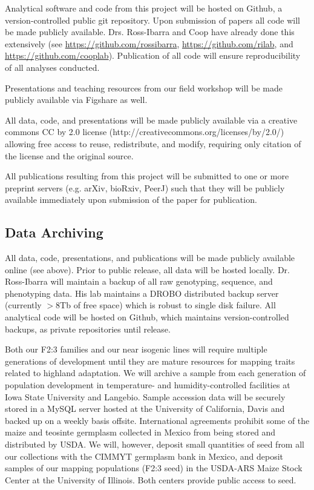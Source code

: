 Analytical software and code from this project will be hosted on Github, a version-controlled public git repository.  Upon submission of papers all code will be made publicly available.  Drs. Ross-Ibarra and Coop have already done this extensively (see \url{https://github.com/rossibarra}, \url{https://github.com/rilab}, and \url{https://github.com/cooplab}). Publication of all code will ensure reproducibility of all analyses conducted.  

Presentations and teaching resources from our field workshop will be made publicly available via Figshare as well.

All data, code, and presentations will be made publicly available via a creative commons CC by 2.0 license (http://creativecommons.org/licenses/by/2.0/) allowing free access to reuse, redistribute, and modify, requiring only citation of the license and the original source.

All publications resulting from this project will be submitted to one or more preprint servers (e.g. arXiv, bioRxiv, PeerJ) such that they will be publicly available immediately upon submission of the paper for publication.

\subsection*{Data Archiving}

All data, code, presentations, and publications will be made publicly available online (see above).  Prior to public release, all data will be hosted locally.  Dr. Ross-Ibarra will maintain a backup of all raw genotyping, sequence, and phenotyping data.  His lab maintains a DROBO distributed backup server (currently $>8$Tb of free space) which is robust to single disk failure. All analytical code will be hosted on Github, which maintains version-controlled backups, as private repositories until release. 

Both our F2:3 families and our near isogenic lines will require multiple generations of development until they are mature resources for mapping traits related to highland adaptation. We will archive a sample from each generation of population development in temperature- and humidity-controlled facilities at Iowa State University and Langebio. Sample accession data will be securely stored in a MySQL server hosted at the University of California, Davis and backed up on a weekly basis offsite.  International agreements prohibit some of the maize and teosinte germplasm collected in Mexico from being stored and distributed by USDA.  We will, however, deposit small quantities of seed from all our collections with the CIMMYT germplasm bank in Mexico, and deposit samples of our mapping populations (F2:3 seed) in the USDA-ARS Maize Stock Center at the University of Illinois.  Both centers provide public access to seed.
